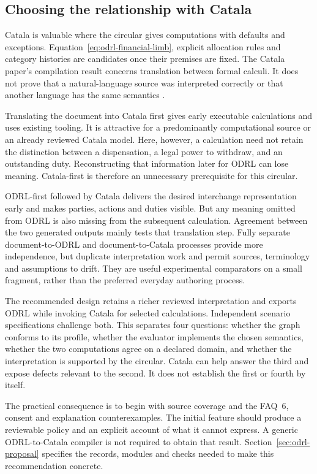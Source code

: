\subsection{Choosing the relationship with Catala}

Catala is valuable where the circular gives computations with defaults and
exceptions. Equation~\ref{eq:odrl-financial-limb}, explicit allocation rules
and category histories are candidates once their premises are fixed. The
Catala paper's compilation result concerns translation between formal calculi.
It does not prove that a natural-language source was interpreted correctly
or that another language has the same semantics
\citep[secs.~4.2--4.5]{catala2021}.

Translating the document into Catala first gives early executable calculations
and uses existing tooling. It is attractive for a predominantly computational
source or an already reviewed Catala model. Here, however, a calculation need
not retain the distinction between a dispensation, a legal power to withdraw,
and an outstanding duty. Reconstructing that information later for ODRL can
lose meaning. Catala-first is therefore an unnecessary prerequisite for this
circular.

ODRL-first followed by Catala delivers the desired interchange representation
early and makes parties, actions and duties visible. But any meaning omitted
from ODRL is also missing from the subsequent calculation. Agreement between
the two generated outputs mainly tests that translation step. Fully separate
document-to-ODRL and document-to-Catala processes provide more independence,
but duplicate interpretation work and permit sources, terminology and
assumptions to drift. They are useful experimental comparators on a small
fragment, rather than the preferred everyday authoring process.

The recommended design retains a richer reviewed interpretation and exports
ODRL while invoking Catala for selected calculations. Independent scenario
specifications challenge both. This separates four questions: whether the
graph conforms to its profile, whether the evaluator implements the chosen
semantics, whether the two computations agree on a declared domain, and
whether the interpretation is supported by the circular. Catala can help
answer the third and expose defects relevant to the second. It does not
establish the first or fourth by itself.

The practical consequence is to begin with source coverage and the FAQ~6,
consent and explanation counterexamples. The initial feature should produce a
reviewable policy and an explicit account of what it cannot express. A generic
ODRL-to-Catala compiler is not required to obtain that result.
Section~\ref{sec:odrl-proposal} specifies the records, modules and checks
needed to make this recommendation concrete.
